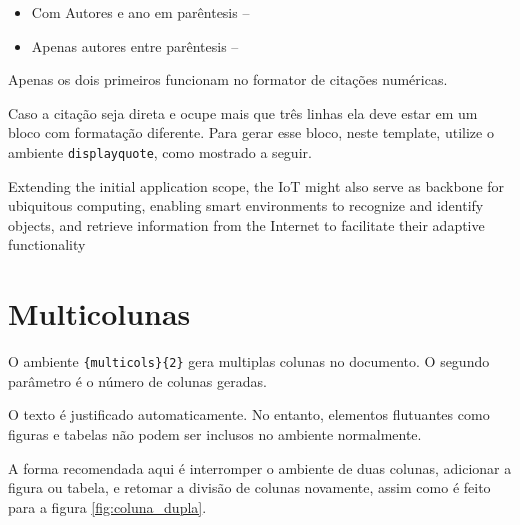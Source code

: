     \begin{itemize}
        \item Com Autores e ano em parêntesis -- \cite{wortmann2015internet}
        \item Apenas autores entre parêntesis -- \citeauthor{ashton2009internet}
    \end{itemize}

    Apenas os dois primeiros funcionam no formator de citações numéricas.

    Caso a citação seja direta e ocupe mais que três linhas ela deve estar em um bloco com formatação diferente.
    Para gerar esse bloco, neste template, utilize o ambiente \lstinline[language=TeX,style=code]|displayquote|, como mostrado a seguir.


    \begin{displayquote}
    Extending the initial application scope, the IoT might also serve as backbone for
    ubiquitous computing, enabling smart environments to recognize and identify
     objects, and retrieve information from the Internet to facilitate their adaptive
    functionality
    \end{displayquote}


\section{Multicolunas}
\label{sec:multicolunas}


    \begin{multicols}{2}
        O ambiente \lstinline[language=TeX,style=code]|{multicols}{2}| gera multiplas colunas no documento.
        O segundo parâmetro é o número de colunas geradas.

        O texto é justificado automaticamente.
        No entanto, elementos flutuantes como figuras e tabelas não podem ser inclusos no ambiente normalmente.

        A forma recomendada aqui é interromper o ambiente de duas colunas, adicionar a figura ou tabela, e retomar a divisão de colunas novamente, assim como é feito para a figura \ref{fig:coluna_dupla}.
    \end{multicols}

